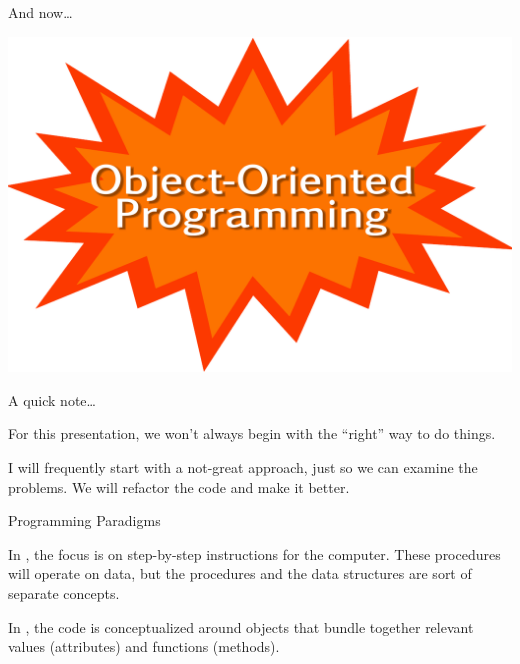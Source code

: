 \documentclass[aspectratio=169] {beamer}
\begin{document}
{
\begin{frame}{And now\dots}
  \vspace{-5ex} \pause
  \begin{center}  
    \includegraphics[scale=.6]{starburstsf}
  \end{center}
\end{frame}
}





\begin{frame}[fragile]{A quick note\dots}

  For this presentation, we won't always begin with the ``right'' way to do things.

  \medskip

  I will frequently start with a not-great approach, just so we can examine the problems.
  We will refactor the code and make it better.
  
  \medskip \pause
  

\end{frame}





\begin{frame}[fragile]{Programming Paradigms}

  In ,
  the focus is on step-by-step instructions for the computer.
  These procedures will operate on data, but the procedures 
  and the data structures are sort of separate concepts.

  \bigskip \pause

  In ,
  the code is conceptualized around objects 
  that bundle together relevant values (attributes) and functions (methods).


\end{frame}
\end{document}

